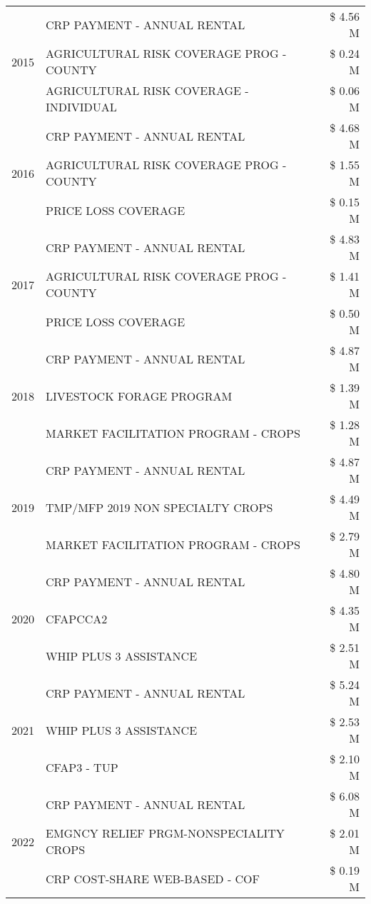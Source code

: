 \begin{tabular}{llr}
\cline{1-3}
\multirow[t]{3}{*}{2015} & CRP PAYMENT - ANNUAL RENTAL & \$ 4.56 M \\
 & AGRICULTURAL RISK COVERAGE PROG - COUNTY & \$ 0.24 M \\
 & AGRICULTURAL RISK COVERAGE - INDIVIDUAL & \$ 0.06 M \\
\cline{1-3}
\multirow[t]{3}{*}{2016} & CRP PAYMENT - ANNUAL RENTAL & \$ 4.68 M \\
 & AGRICULTURAL RISK COVERAGE PROG - COUNTY & \$ 1.55 M \\
 & PRICE LOSS COVERAGE & \$ 0.15 M \\
\cline{1-3}
\multirow[t]{3}{*}{2017} & CRP PAYMENT - ANNUAL RENTAL & \$ 4.83 M \\
 & AGRICULTURAL RISK COVERAGE PROG - COUNTY & \$ 1.41 M \\
 & PRICE LOSS COVERAGE & \$ 0.50 M \\
\cline{1-3}
\multirow[t]{3}{*}{2018} & CRP PAYMENT - ANNUAL RENTAL & \$ 4.87 M \\
 & LIVESTOCK FORAGE PROGRAM & \$ 1.39 M \\
 & MARKET FACILITATION PROGRAM - CROPS & \$ 1.28 M \\
\cline{1-3}
\multirow[t]{3}{*}{2019} & CRP PAYMENT - ANNUAL RENTAL & \$ 4.87 M \\
 & TMP/MFP 2019 NON SPECIALTY CROPS & \$ 4.49 M \\
 & MARKET FACILITATION PROGRAM - CROPS & \$ 2.79 M \\
\cline{1-3}
\multirow[t]{3}{*}{2020} & CRP PAYMENT - ANNUAL RENTAL & \$ 4.80 M \\
 & CFAPCCA2 & \$ 4.35 M \\
 & WHIP PLUS 3 ASSISTANCE & \$ 2.51 M \\
\cline{1-3}
\multirow[t]{3}{*}{2021} & CRP PAYMENT - ANNUAL RENTAL & \$ 5.24 M \\
 & WHIP PLUS 3 ASSISTANCE & \$ 2.53 M \\
 & CFAP3 - TUP & \$ 2.10 M \\
\cline{1-3}
\multirow[t]{3}{*}{2022} & CRP PAYMENT - ANNUAL RENTAL & \$ 6.08 M \\
 & EMGNCY RELIEF PRGM-NONSPECIALITY CROPS & \$ 2.01 M \\
 & CRP COST-SHARE WEB-BASED - COF & \$ 0.19 M \\
\cline{1-3}
\bottomrule
\end{tabular}

